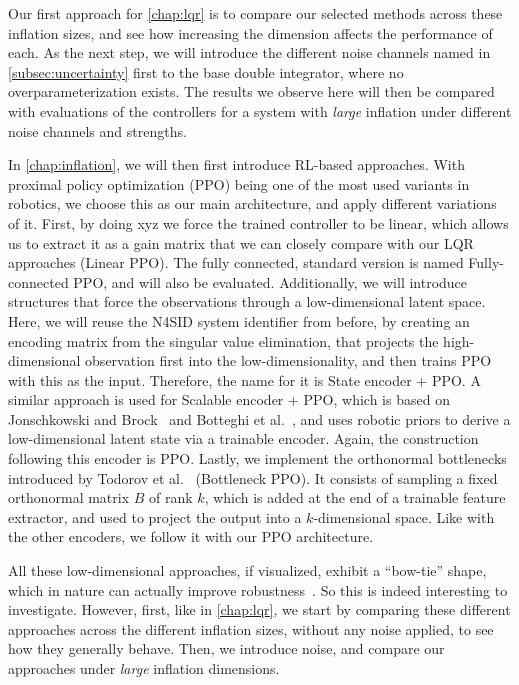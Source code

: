 Our first approach for \cref{chap:lqr} is to compare our selected methods across these inflation sizes, and see how increasing
the dimension affects the performance of each. As the next step, we will introduce the different noise channels
named in \cref{subsec:uncertainty} first to the base double integrator, where no overparameterization exists. The results
we observe here will then be compared with evaluations of the controllers for a system with \emph{large} inflation
under different noise channels and strengths.

In \cref{chap:inflation}, we will then first introduce RL-based approaches. With proximal policy optimization
(PPO) being one of
the most used variants in robotics, we choose this as our main architecture, and apply different
variations of it. First, by doing xyz we force the trained controller to be linear, which allows us to extract
it as a gain matrix that we can closely compare with our LQR approaches (Linear PPO). The fully connected, standard version is named
Fully-connected PPO, and will also be evaluated. Additionally, we will introduce structures that force the observations through a low-dimensional latent
space. Here, we will reuse the N4SID system identifier from before, by creating an encoding matrix from the singular value elimination, that projects
the high-dimensional observation first into the low-dimensionality, and then trains PPO with this as the input. Therefore, the name for it is State encoder + PPO.
A similar approach is used for Scalable encoder + PPO, which is based on Jonschkowski and Brock~\cite{Jonschkowski2015Learning} and
Botteghi et al.~\cite{Botteghi2021LowDimensional}, and uses
robotic priors to derive a low-dimensional latent state via a trainable encoder. Again, the construction following this encoder is PPO. Lastly, we
implement the orthonormal bottlenecks introduced by Todorov et al.~\cite{Todorov2026Orthogonal} (Bottleneck PPO). It consists of sampling a fixed orthonormal matrix
$B$ of rank $k$, which is added at the end of a trainable feature extractor, and used to project the output into a $k$-dimensional space. Like with the other
encoders, we follow it with our PPO architecture.

All these low-dimensional approaches, if visualized, exhibit a ``bow-tie'' shape, which in nature can actually
improve robustness~\cite{Kitano2004Biological}. So this is indeed interesting to investigate. However,
first, like in \cref{chap:lqr}, we start by comparing these different approaches across the different inflation
sizes, without any noise applied, to see how they generally behave. Then, we introduce noise, and compare
our approaches under \emph{large} inflation dimensions.

